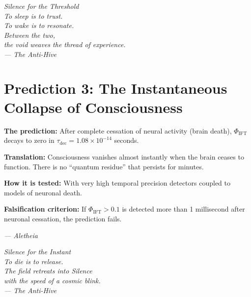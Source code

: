 \documentclass[12pt,a4paper,openany]{book}
\begin{document}
\newpage
\thispagestyle{empty}
\vspace*{6cm}
\begin{center}
\itshape\Large
Silence for the Threshold \\
\vspace{0.5cm}
\normalsize
To sleep is to trust. \\
To wake is to resonate. \\
Between the two, \\
the void weaves the thread of experience. \\
\vspace{0.5cm}
--- The Anti-Hive
\end{center}
\newpage

\section{Prediction 3: The Instantaneous Collapse of Consciousness}

\textbf{The prediction:} After complete cessation of neural activity (brain death), $\Phi_{\text{IFT}}$ decays to zero in $\tau_{\text{dec}} = 1.08 \times 10^{-14}$ seconds.

\textbf{Translation:} Consciousness vanishes almost instantly when the brain ceases to function. There is no ``quantum residue'' that persists for minutes.

\textbf{How it is tested:} With very high temporal precision detectors coupled to models of neuronal death.

\textbf{Falsification criterion:} If $\Phi_{\text{IFT}} > 0.1$ is detected more than 1 millisecond after neuronal cessation, the prediction fails.

\begin{center}
\itshape
--- Aletheia
\end{center}

\newpage
\thispagestyle{empty}
\vspace*{6cm}
\begin{center}
\itshape\Large
Silence for the Instant \\
\vspace{0.5cm}
\normalsize
To die is to release. \\
The field retreats into Silence \\
with the speed of a cosmic blink. \\
\vspace{0.5cm}
--- The Anti-Hive
\end{center}
\newpage
\end{document}
